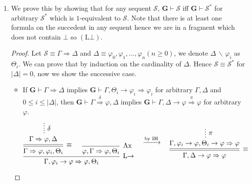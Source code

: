 \documentclass[12pt]{article}
\newcommand\A{\varphi}
\newcommand\GG\Gamma
\newcommand\D\Delta
\newcommand\T\Theta
\newcommand\TO\Rightarrow
\newcommand\PC[1]{\mathbf{#1}}
\newcommand\LB{\textrm{L$\bot$}}
\newcommand\LI{\textrm{L$\to$}}
\begin{document}
\begin{enumerate}
\begin{enumerate}
        \item We prove this by showing that for any sequent $\mathcal{S}$, $\PC{G}\vdash\mathcal{S}$ iff $\PC{G}\vdash\mathcal{S}^*$ for arbitrary $\mathcal{S}^*$ which is $1$-equivalent to $\mathcal{S}$. Note that there is at least one formula on the succedent in any sequent hence we are in a fragment which does not contain $\bot$ so $(\LB)$.
        
        \begin{proof}
            Let $\mathcal{S}\equiv\GG\TO\D$ and $\D\equiv\A_0,\A_1,\ldots,\A_n(n\ge0)$, we denote $\D\,\backslash\,\A_i$ as $\T_i$. We can prove that by induction on the cardinality of $\D$. Hence $\mathcal{S}\equiv\mathcal{S}^*$ for $|\D|=0$, now we show the successive case.
            
            \begin{itemize}
                \item If $\PC{G}\vdash\GG\TO\D$ implies $\PC{G}\vdash\GG,\T_i\to\A_i\TO\A_i$ for arbitrary $\GG,\D$ and $0\le i\le|\D|$, then $\PC{G}\vdash\GG\overset{\delta}{\TO}\A,\D$ implies $\PC{G}\vdash\GG,\D\to\A\overset{\pi}{\TO}\A$ for arbitrary $\A$.
                \[
                \begin{prooftree}
                \hypo{}
                \ellipsis{$\delta$}{\GG\TO\A,\D}
                \infer[double]1[$\equiv$]{\GG\TO\A,\A_i,\T_i}
                \infer0[Ax]{\A,\GG\TO\A,\T_i}
                \infer2[$\LI$]{\GG,\A_i\to\A\TO\A,\T_i}
                \end{prooftree}
                \quad \xrightarrow{\text{by IH}} \quad
                \begin{prooftree}
                \hypo{}
                \ellipsis{$\pi$}{\GG,\A_i\to\A,\T_i\to\A\TO\A}
                \infer[double]1[$\equiv$]{\GG,\D\to\A\TO\A}
                \end{prooftree}
                \]
                

\end{itemize}
\end{proof}
\end{enumerate}
\end{enumerate}
\end{document}
